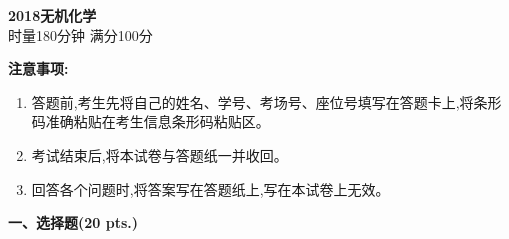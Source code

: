 \begin{center}
    {\LARGE \textbf{2018无机化学}} \\[2ex]
    {\large 时量180分钟 \quad 满分100分}
\end{center}

\vspace{0.5cm}
\noindent\textbf{注意事项:}
\begin{enumerate}[label=\arabic*., parsep=0pt, itemsep=0pt]
    \item 答题前,考生先将自己的姓名、学号、考场号、座位号填写在答题卡上,将条形码准确粘贴在考生信息条形码粘贴区。
    \item 考试结束后,将本试卷与答题纸一并收回。
    \item 回答各个问题时,将答案写在答题纸上,写在本试卷上无效。
\end{enumerate}

\vspace{0.5cm}
\noindent\textbf{一、选择题(20 pts.)}

